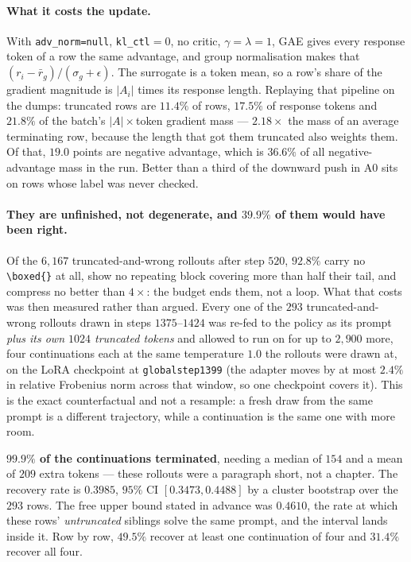 \paragraph{What it costs the update.} With \texttt{adv\_norm=null}, \texttt{kl\_ctl}$=0$, no
critic, $\gamma=\lambda=1$, GAE gives every response token of a row the same advantage, and
group normalisation makes that $(r_i - \bar r_g)/(\sigma_g+\epsilon)$. The surrogate is a
token mean, so a row's share of the gradient magnitude is $|A_i|$ times its response length.
Replaying that pipeline on the dumps: truncated rows are $11.4\%$ of rows, $17.5\%$ of
response tokens and $\mathbf{21.8\%}$ of the batch's $|A|\times$token gradient mass ---
$2.18\times$ the mass of an average terminating row, because the length that got them
truncated also weights them. Of that, $19.0$ points are negative advantage, which is
$\mathbf{36.6\%}$ of all negative-advantage mass in the run. Better than a third of the
downward push in A0 sits on rows whose label was never checked.

\paragraph{They are unfinished, not degenerate, and $39.9\%$ of them would have been
right.} Of the $6{,}167$ truncated-and-wrong rollouts after step $520$, $92.8\%$ carry no
\verb|\boxed{}| at all, show no repeating block covering more than half their tail, and
compress no better than $4\times$: the budget ends them, not a loop. What that costs was then
measured rather than argued. Every one of the $293$ truncated-and-wrong rollouts drawn in
steps $1375$--$1424$ was re-fed to the policy as its prompt \emph{plus its own $1024$
truncated tokens} and allowed to run on for up to $2{,}900$ more, four continuations each at
the same temperature $1.0$ the rollouts were drawn at, on the LoRA checkpoint at
\texttt{globalstep1399} (the adapter moves by at most $2.4\%$ in relative Frobenius norm
across that window, so one checkpoint covers it). This is the exact counterfactual and not a
resample: a fresh draw from the same prompt is a different trajectory, while a continuation is
the same one with more room.

\textbf{$99.9\%$ of the continuations terminated}, needing a median of $154$ and a mean of
$209$ extra tokens --- these rollouts were a paragraph short, not a chapter. The recovery rate
is $\mathbf{0.3985}$, $95\%$ CI $[0.3473, 0.4488]$ by a cluster bootstrap over
the $293$ rows. The free upper bound stated in advance was $0.4610$, the rate at which these
rows' \emph{untruncated} siblings solve the same prompt, and the interval lands inside it. Row
by row, $49.5\%$ recover at least one continuation of four and $31.4\%$ recover all four.

